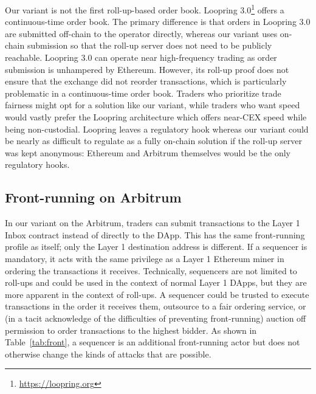 Our \cm variant is not the first roll-up-based order book. Loopring 3.0\footnote{\url{https://loopring.org}} offers a continuous-time order book. The primary difference is that orders in Loopring 3.0 are submitted off-chain to the operator directly, whereas our variant uses on-chain submission so that the roll-up server does not need to be publicly reachable. Loopring 3.0 can operate near high-frequency trading as order submission is unhampered by Ethereum. However, its  roll-up proof does not ensure that the exchange did not reorder transactions, which is particularly problematic in a continuous-time order book. Traders who prioritize trade fairness might opt for a solution like our variant, while traders who want speed would vastly prefer the Loopring architecture which offers near-CEX speed while being non-custodial. Loopring leaves a regulatory hook whereas our variant could be nearly as difficult to regulate as a fully on-chain solution if the roll-up server was kept anonymous: Ethereum and Arbitrum themselves would be the only regulatory hooks.


\subsection{Front-running on Arbitrum}
\label{sec:frontarb}

In our \cm variant on the Arbitrum, traders can submit transactions to the Layer 1 Inbox contract instead of directly to the \cm DApp. This has the same front-running profile as \cm itself; only the Layer 1 destination address is different. If a sequencer is mandatory, it acts with the same privilege as a Layer 1 Ethereum miner in ordering the transactions it receives. Technically, sequencers are not limited to roll-ups and could be used in the context of normal Layer 1 DApps, but they are more apparent in the context of roll-ups. A sequencer could be trusted to execute transactions in the order it receives them, outsource to a fair ordering service, or (in a tacit acknowledge of the difficulties of preventing front-running) auction off permission to order transactions to the highest bidder. As shown in Table~\ref{tab:front}, a sequencer is an additional front-running actor but does not otherwise change the kinds of attacks that are possible.

